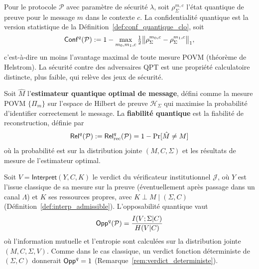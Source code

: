 \begin{sloppypar}
\begin{definition}\label{def:conf_quantique}
Pour le protocole $\mathcal{P}$ avec param\`etre de s\'ecurit\'e $\lambda$, soit
$\rho_\Sigma^{m,c}$ l'\'etat quantique de preuve pour le message $m$ dans le
contexte $c$. La confidentialit\'e quantique est la version statistique de la
D\'efinition~\ref{def:conf_quantique_clo}, soit
\begin{equation}
\mathsf{Conf}^q(\mathcal{P}) := 1 - \max_{m_0,m_1,c}\tfrac{1}{2}\bigl\|\rho_\Sigma^{m_0,c} - \rho_\Sigma^{m_1,c}\bigr\|_1 ,
\label{eq:conf_q_pq}
\end{equation}
c'est-\`a-dire un moins l'avantage maximal de toute mesure POVM (th\'eor\`eme de
Helstrom). La s\'ecurit\'e contre des adversaires QPT est une propri\'et\'e
calculatoire distincte, plus faible, qui rel\`eve des jeux de s\'ecurit\'e.
\end{definition}

\begin{definition}\label{def:fiabilite_quantique}
Soit $\hat{M}$ l'\textbf{estimateur quantique optimal de message}, d\'efini
comme la mesure POVM $\{\Pi_m\}$ sur l'espace de Hilbert de preuve
$\mathcal{H}_\Sigma$ qui maximise la probabilit\'e d'identifier correctement
le message.
La \textbf{fiabilit\'e quantique} est la fiabilit\'e de reconstruction, d\'efinie par
\begin{equation}
\mathsf{Rel}^q(\mathcal{P}) := \mathsf{Rel}_{\mathrm{rec}}^q(\mathcal{P}) = 1 - \Pr[\hat{M} \neq M]
\label{eq:rel_q_pq}
\end{equation}
o\`u la probabilit\'e est sur la distribution jointe $(M, C, \Sigma)$ et les
r\'esultats de mesure de l'estimateur optimal.
\end{definition}

\begin{definition}\label{def:opposabilite_quantique}
Soit $V = \mathsf{Interpret}(Y, C, K)$ le verdict du v\'erificateur institutionnel
$\mathcal{J}$, o\`u $Y$ est l'issue classique de sa mesure sur la preuve (\'eventuellement
apr\`es passage dans un canal $\Lambda$) et $K$ ses ressources propres,
avec $K \perp M \mid (\Sigma, C)$ (D\'efinition~\ref{def:interp_admissible}). L'opposabilit\'e quantique vaut
\begin{equation}
\mathsf{Opp}^q(\mathcal{P}) = \frac{I(V; \Sigma|C)}{H(V|C)}
\label{eq:opp_q_pq}
\end{equation}
o\`u l'information mutuelle et l'entropie sont calcul\'ees sur la distribution
jointe $(M, C, \Sigma, V)$. Comme dans le cas classique, un verdict fonction
d\'eterministe de $(\Sigma,C)$ donnerait $\mathsf{Opp}^q = 1$
(Remarque~\ref{rem:verdict_deterministe}).
\end{definition}


\end{sloppypar}
